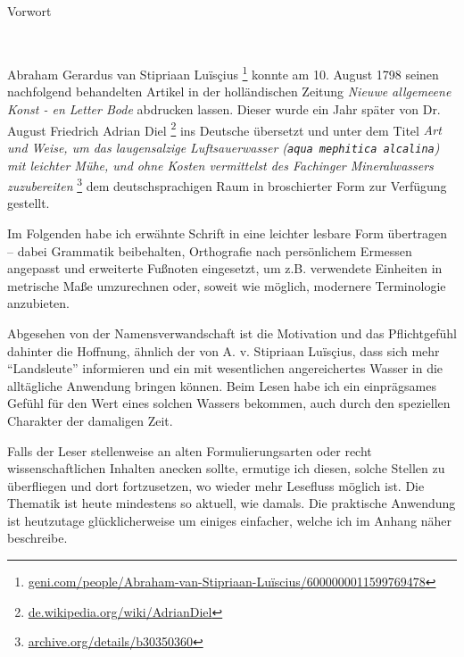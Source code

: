\documentclass[a5paper,fontsize=10pt]{memoir}
\begin{document}

{\centering
{\Large Vorwort}
\vspace{2em}

\begin{minipage}{4cm}
  \hrulefill\\
\end{minipage}

}
\vfill
Abraham Gerardus van Stipriaan Luïsçius%
\footnote{\href{https://web.archive.org/web/20210927050342/https://www.geni.com/people/Abraham-van-Stipriaan-Luïscius/6000000011599769478}
{geni.com/people/Abraham-van-Stipriaan-Luïscius/6000000011599769478}}
konnte am 10. August 1798
seinen nachfolgend behandelten Artikel in der holländischen Zeitung
\emph{Nieuwe allgemeene Konst - en Letter Bode}
abdrucken lassen.
Dieser wurde ein Jahr später
von Dr. August Friedrich Adrian Diel%
\footnote{\href{https://web.archive.org/web/20160828042236/https://de.wikipedia.org/wiki/Adrian_Diel}
{de.wikipedia.org/wiki/Adrian\textunderscore Diel}}
ins Deutsche übersetzt und unter dem Titel
\emph{Art und Weise,
um das laugensalzige Luftsauerwasser
(\texttt{aqua mephitica alcalina})
mit leichter Mühe, und ohne Kosten
vermittelst des Fachinger Mineralwassers zuzubereiten}%
\footnote{\href{https://archive.org/details/b30350360}
{archive.org/details/b30350360}}
dem deutschsprachigen Raum in broschierter Form
zur Verfügung gestellt.

Im Folgenden habe ich erwähnte Schrift
in eine leichter lesbare Form übertragen --
dabei Grammatik beibehalten,
Orthografie nach persönlichem Ermessen angepasst
und erweiterte Fußnoten eingesetzt,
um z.B. verwendete Einheiten in metrische Maße umzurechnen
oder, soweit wie möglich, modernere Terminologie anzubieten.

Abgesehen von der Namensverwandschaft
ist die Motivation und das Pflichtgefühl dahinter
die Hoffnung,
ähnlich der von A. v. Stipriaan Luïsçius,
dass sich mehr ``Landsleute'' informieren und ein
mit wesentlichen 
angereichertes Wasser
in die alltägliche Anwendung bringen können.
Beim Lesen habe ich ein einprägsames Gefühl für den Wert
eines solchen Wassers bekommen,
auch durch den speziellen Charakter der damaligen Zeit.

Falls der Leser
stellenweise an alten Formulierungsarten
oder recht wissenschaftlichen Inhalten anecken
sollte, ermutige ich diesen,
solche Stellen zu überfliegen und dort fortzusetzen,
wo wieder mehr Lesefluss möglich ist.
Die Thematik ist heute mindestens so aktuell, wie damals.
Die praktische Anwendung 
ist heutzutage glücklicherweise um einiges einfacher,
welche ich im Anhang näher beschreibe.
\end{document}
